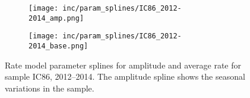 \begin{figure}[htbp]
  \centering
  \begin{subfigure}[c]{0.49\textwidth}
    \texttt{[image: inc/param\_splines/IC86\_2012-2014\_amp.png]}
  \end{subfigure}
  \hfill
  \begin{subfigure}[c]{0.49\textwidth}
    \texttt{[image: inc/param\_splines/IC86\_2012-2014\_base.png]}
  \end{subfigure}
  \caption{Rate model parameter splines for amplitude and average rate for sample IC86, 2012–2014. The amplitude spline shows the seasonal variations in the sample.}
  \label{fig:param_splines}
\end{figure}

